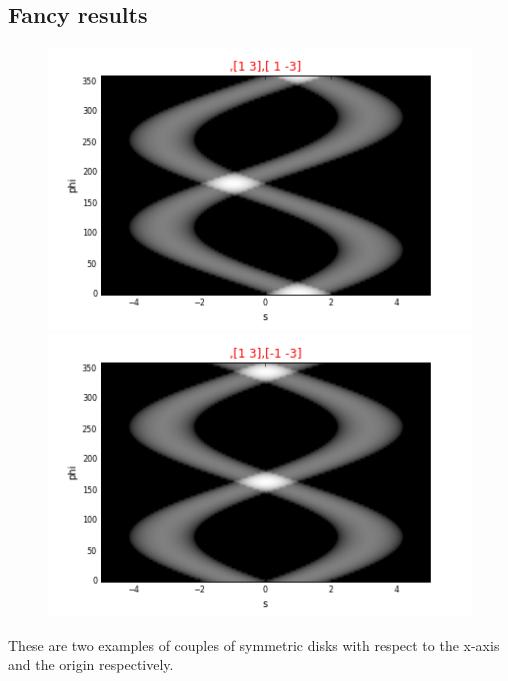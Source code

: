 \documentclass[a4,12pt]{article}
\begin{document}
\subsection{Fancy results}
\begin{figure}[h!]
   \begin{minipage}[c]{.46\linewidth}
      \includegraphics[scale=0.5]{../images/sinograms/2SymmetricDisks3.png} 
   \end{minipage} \hfill
   \begin{minipage}[c]{.46\linewidth}
      \includegraphics[scale=0.5]{../images/sinograms/2SymmetricDisks4.png} 
   \end{minipage}
\end{figure}
These are two examples of couples of symmetric disks with respect to the x-axis and the origin respectively.
\end{document}
